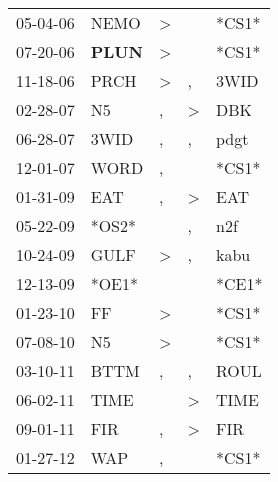 \begin{supertabular}{p{0.07\textwidth}p{0.06\textwidth}p{0.02\textwidth}p{0.02\textwidth}p{0.06\textwidth}}
 05-04-06\textsuperscript{} &           NEMO\textsuperscript{} &  \textgreater &               &                            *CS1* \\
 07-20-06\textsuperscript{} &  \textbf{PLUN\textsuperscript{}} &  \textgreater &               &                            *CS1* \\
 11-18-06\textsuperscript{} &           PRCH\textsuperscript{} &  \textgreater &             , &           3WID\textsuperscript{} \\
 02-28-07\textsuperscript{} &             N5\textsuperscript{} &             , &  \textgreater &            DBK\textsuperscript{} \\
 06-28-07\textsuperscript{} &           3WID\textsuperscript{} &             , &             , &           pdgt\textsuperscript{} \\
 12-01-07\textsuperscript{} &           WORD\textsuperscript{} &             , &               &                            *CS1* \\
 01-31-09\textsuperscript{} &            EAT\textsuperscript{} &             , &  \textgreater &            EAT\textsuperscript{} \\
 05-22-09\textsuperscript{} &                            *OS2* &               &             , &            n2f\textsuperscript{} \\
 10-24-09\textsuperscript{} &           GULF\textsuperscript{} &  \textgreater &             , &           kabu\textsuperscript{} \\
 12-13-09\textsuperscript{} &                            *OE1* &               &               &                            *CE1* \\
 01-23-10\textsuperscript{} &             FF\textsuperscript{} &  \textgreater &               &                            *CS1* \\
 07-08-10\textsuperscript{} &             N5\textsuperscript{} &  \textgreater &               &                            *CS1* \\
 03-10-11\textsuperscript{} &           BTTM\textsuperscript{} &             , &             , &           ROUL\textsuperscript{} \\
 06-02-11\textsuperscript{} &           TIME\textsuperscript{} &               &  \textgreater &           TIME\textsuperscript{} \\
 09-01-11\textsuperscript{} &            FIR\textsuperscript{} &             , &  \textgreater &            FIR\textsuperscript{} \\
 01-27-12\textsuperscript{} &            WAP\textsuperscript{} &             , &               &                            *CS1* \\

\end{supertabular}
